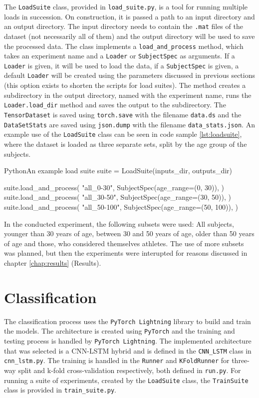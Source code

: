 \documentclass[english, he, bc, kiv, iso690alph]{fasthesis}
\begin{document}
The \texttt{LoadSuite} class, provided in \texttt{load\_suite.py}, is a tool for running multiple loads in succession. On construction, it is passed a path to an input directory and an output directory. The input directory needs to contain the \texttt{.mat} files of the dataset (not necessarily all of them) and the output directory will be used to save the processed data.
The class implements a \texttt{load\_and\_process} method, which takes an experiment name and a \texttt{Loader} or \texttt{SubjectSpec} as arguments. If a \texttt{Loader} is given, it will be used to load the data, if a \texttt{SubjectSpec} is given, a default \texttt{Loader} will be created using the parameters discussed in previous sections (this option exists to shorten the scripts for load suites).
The method creates a subdirectory in the output directory, named with the experiment name, runs the \texttt{Loader.load\_dir} method and saves the output to the subdirectory. The \texttt{TensorDataset} is saved using \texttt{torch.save} with the filename \texttt{data.ds} and the \texttt{DataSetStats} are saved using \texttt{json.dump} with the filename \texttt{data\_stats.json}. An example use of the \texttt{LoadSuite} class can be seen in code sample \ref{lst:loadsuite}, where the dataset is loaded as three separate sets, split by the age group of the subjects.

\begin{code}{Python}{An example load suite\label{lst:loadsuite}}
	suite = LoadSuite(inputs_dir, outputs_dir)

	suite.load_and_process(
	"all_0-30",
	SubjectSpec(age_range=(0, 30)),
	)
	suite.load_and_process(
	"all_30-50",
	SubjectSpec(age_range=(30, 50)),
	)
	suite.load_and_process(
	"all_50-100",
	SubjectSpec(age_range=(50, 100)),
	)
\end{code}

In the conducted experiment, the following subsets were used: All subjects, younger than 30 years of age, between 30 and 50 years of age, older than 50 years of age and those, who considered themselves athletes. The use of more subsets was planned, but then the experiments were interupted for reasons discussed in chapter \ref{chap:results} (Results).

\section{Classification}

The classification process uses the \texttt{PyTorch Lightning} library to build and train the models. The architecture is created using \texttt{PyTorch} and the training and testing process is handled by \texttt{PyTorch Lightning}. The implemented architecture that was selected is a CNN-LSTM hybrid and is defined in the \texttt{CNN\_LSTM} class in \texttt{cnn\_lstm.py}. The training is handled in the \texttt{Runner} and \texttt{KFoldRunner} for three-way split and k-fold cross-validation respectively, both defined in \texttt{run.py}. For running a suite of experiments, created by the \texttt{LoadSuite} class, the \texttt{TrainSuite} class is provided in \texttt{train\_suite.py}.
\end{document}
